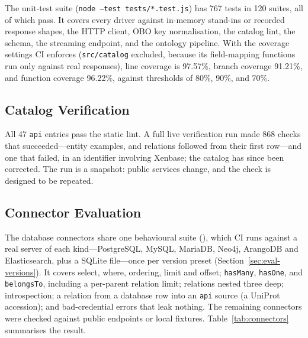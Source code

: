 \documentclass[sigconf,nonacm]{acmart}
\begin{document}
The unit-test suite (\texttt{node --test tests/*.test.js}) has 767 tests
in 120 suites, all of which pass.  It covers every driver against
in-memory stand-ins or recorded response shapes, the HTTP client, OBO
key normalisation, the catalog lint, the schema, the streaming endpoint,
and the ontology pipeline.  With the coverage settings CI enforces
(\texttt{src/catalog} excluded, because its field-mapping functions run
only against real responses), line coverage is 97.57\%, branch coverage
91.21\%, and function coverage 96.22\%, against thresholds of 80\%,
90\%, and 70\%.

\subsection{Catalog Verification}
\label{sec:eval-catalog}

All 47 \texttt{api} entries pass the static lint.  A full live
verification run made 868 checks that succeeded---entity examples, and
relations followed from their first row---and one that failed, in an
identifier involving Xenbase; the catalog has since been corrected.
The run is a snapshot: public services change, and the check is
designed to be repeated.

\subsection{Connector Evaluation}
\label{sec:eval-connectors}

The database connectors share one behavioural suite
(), which CI runs against a real
server of each kind---PostgreSQL, MySQL, MariaDB, Neo4j, ArangoDB and
Elasticsearch, plus a SQLite file---once per version preset
(Section~\ref{sec:eval-versions}).  It covers
select, where, ordering, limit and offset; \texttt{hasMany},
\texttt{hasOne}, and \texttt{belongsTo}, including a per-parent relation
limit; relations nested three deep; introspection; a relation from a
database row into an \texttt{api} source (a UniProt accession); and
bad-credential errors that leak nothing.  The remaining connectors
were checked against public endpoints or local fixtures.
Table~\ref{tab:connectors} summarises the result.
\end{document}
